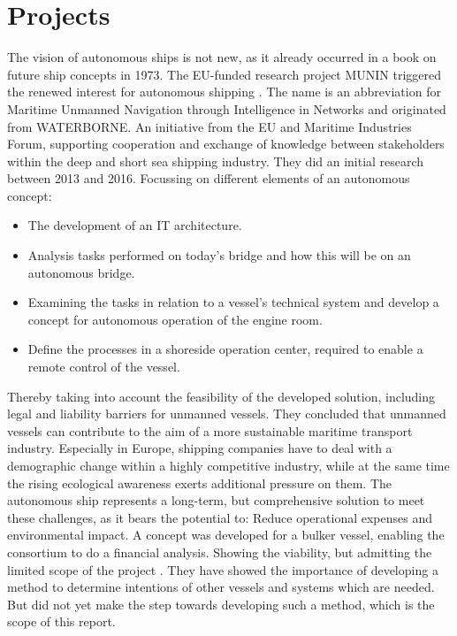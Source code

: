 \section{Projects}
The vision of autonomous ships is not new, as it already occurred in a book on future ship concepts in 1973. The EU-funded research project MUNIN triggered the renewed interest for autonomous shipping \cite{Saarni2018}. The name is an abbreviation for Maritime Unmanned Navigation through Intelligence in Networks and originated from WATERBORNE. An initiative from the EU and Maritime Industries Forum, supporting cooperation and exchange of knowledge between stakeholders within the deep and short sea shipping industry. They did an initial research between 2013 and 2016. Focussing on different elements of an autonomous concept: 
\begin{itemize}
	\item The development of an IT architecture. 
	\item Analysis tasks performed on today's bridge and how this will be on an autonomous bridge. 
	\item Examining the tasks in relation to a vessel’s technical system and develop a concept for autonomous operation of the engine room. 
	\item Define the processes in a shoreside operation center, required to enable a remote control of the vessel. 
\end{itemize}
Thereby taking into account the feasibility of the developed solution, including legal and liability barriers for unmanned vessels.
They concluded that unmanned vessels can contribute to the aim of a more sustainable maritime transport industry. Especially in Europe, shipping companies have to deal with a demographic change within a highly competitive industry, while at the same time the rising ecological awareness exerts additional pressure on them. The autonomous ship represents a long-term, but comprehensive solution to meet these challenges, as it bears the potential to: Reduce operational expenses and environmental impact.
A concept was developed for a bulker vessel, enabling the consortium to do a financial analysis. Showing the viability, but admitting the limited scope of the project \cite{MUNIN2016}. They have showed the importance of developing a method to determine intentions of other vessels and systems which are needed. But did not yet make the step towards developing such a method, which is the scope of this report.

